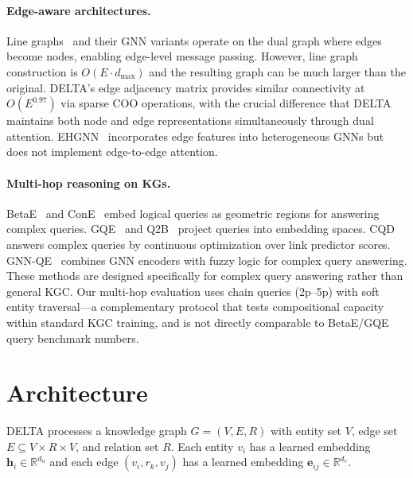 \documentclass{article}
\begin{document}
\paragraph{Edge-aware architectures.}
Line graphs~\cite{chen2017supervised} and their GNN variants operate on the dual graph where edges become nodes, enabling edge-level message passing. However, line graph construction is $O(E \cdot d_{\max})$ and the resulting graph can be much larger than the original. DELTA's edge adjacency matrix provides similar connectivity at $O(E^{0.97})$ via sparse COO operations, with the crucial difference that DELTA maintains both node and edge representations simultaneously through dual attention. EHGNN~\cite{gong2023ehgnn} incorporates edge features into heterogeneous GNNs but does not implement edge-to-edge attention.

\paragraph{Multi-hop reasoning on KGs.}
BetaE~\cite{ren2020beta} and ConE~\cite{zhang2021cone} embed logical queries as geometric regions for answering complex queries. GQE~\cite{hamilton2018embedding} and Q2B~\cite{ren2020query2box} project queries into embedding spaces. CQD~\cite{arakelyan2021cqd} answers complex queries by continuous optimization over link predictor scores. GNN-QE~\cite{zhu2022gnnqe} combines GNN encoders with fuzzy logic for complex query answering. These methods are designed specifically for complex query answering rather than general KGC. Our multi-hop evaluation uses chain queries (2p--5p) with soft entity traversal---a complementary protocol that tests compositional capacity within standard KGC training, and is not directly comparable to BetaE/GQE query benchmark numbers.

\section{Architecture}
\label{sec:architecture}

DELTA processes a knowledge graph $G = (V, E, R)$ with entity set $V$, edge set $E \subseteq V \times R \times V$, and relation set $R$. Each entity $v_i$ has a learned embedding $\mathbf{h}_i \in \mathbb{R}^{d_n}$ and each edge $(v_i, r_k, v_j)$ has a learned embedding $\mathbf{e}_{ij} \in \mathbb{R}^{d_e}$.
\end{document}
